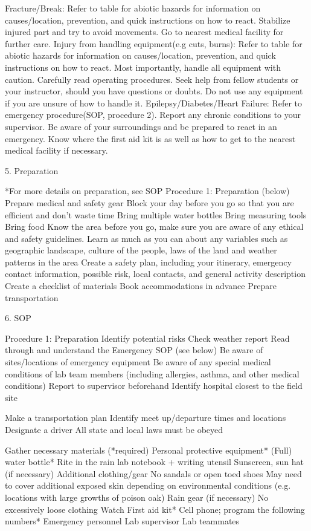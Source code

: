 \documentclass[12pt]{../SOP2}
\begin{document}
Fracture/Break:
Refer to table for abiotic hazards for information on causes/location, prevention, and quick instructions on how to react. Stabilize injured part and try to avoid movements. Go to nearest medical facility for further care.
Injury from handling equipment(e.g cuts, burns):
Refer to table for abiotic hazards for information on causes/location, prevention, and quick instructions on how to react. Most importantly, handle all equipment with caution. Carefully read operating procedures. Seek help from fellow students or your instructor, should you have questions or doubts. Do not use any equipment if you are unsure of how to handle it. 
Epilepsy/Diabetes/Heart Failure:
Refer to emergency procedure(SOP, procedure 2).
Report any chronic conditions to your supervisor.
Be aware of your surroundings and be prepared to react in an emergency.
Know where the first aid kit is as well as how to get to the nearest medical facility if necessary. 

5. Preparation


*For more details on preparation, see SOP Procedure 1: Preparation (below)
Prepare medical and safety gear 
Block your day before you go so that you are efficient and don't waste time
Bring multiple water bottles
Bring measuring tools
Bring food
Know the area before you go, make sure you are aware of any ethical and safety guidelines. Learn as much as you can about any variables such as geographic landscape, culture of the people, laws of the land and weather patterns in the area
Create a safety plan, including your itinerary, emergency contact information, possible risk, local contacts, and general activity description 
Create a checklist of materials 
Book accommodations in advance
Prepare transportation

6. SOP

Procedure 1: Preparation
Identify potential risks
Check weather report
Read through and understand the Emergency SOP (see below)
Be aware of sites/locations of emergency equipment
Be aware of any special medical conditions of lab team members (including allergies, asthma, and other medical conditions)
Report to supervisor beforehand
Identify hospital closest to the field site

Make a transportation plan
Identify meet up/departure times and locations
Designate a driver
All state and local laws must be obeyed

Gather necessary materials (*required)
Personal protective equipment*
(Full) water bottle*
Rite in the rain lab notebook + writing utensil
Sunscreen, sun hat (if necessary)
Additional clothing/gear
No sandals or open toed shoes
May need to cover additional exposed skin depending on environmental conditions (e.g. locations with large growths of poison oak)
Rain gear (if necessary)
No excessively loose clothing
Watch
First aid kit*
Cell phone; program the following numbers*
Emergency personnel
Lab supervisor
Lab teammates
\end{document}
